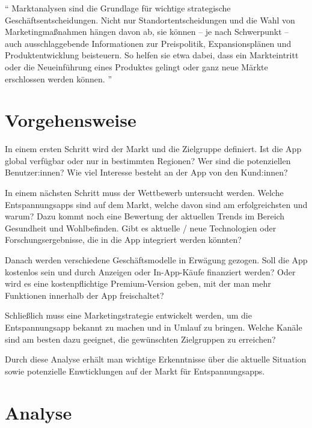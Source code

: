 "`
Marktanalysen sind die Grundlage für wichtige strategische Geschäftsentscheidungen. 
Nicht nur Standortentscheidungen und die Wahl von Marketingmaßnahmen hängen davon ab, sie können – je nach 
Schwerpunkt – auch ausschlaggebende Informationen zur Preispolitik, Expansionsplänen und Produktentwicklung 
beisteuern. So helfen sie etwa dabei, dass ein Markteintritt oder die Neueinführung eines Produktes gelingt
oder ganz neue Märkte erschlossen werden können. 
"'
\cite{marktanalyse}

\section{Vorgehensweise}

In einem ersten Schritt wird der Markt und die Zielgruppe definiert. 
Ist die App global verfügbar oder nur in bestimmten Regionen? Wer sind die potenziellen Benutzer:innen?
Wie viel Interesse besteht an der App von den Kund:innen?

In einem nächsten Schritt muss der Wettbewerb untersucht werden.
Welche Entspannungsapps sind auf dem Markt, welche davon sind am erfolgreichsten und warum?
Dazu kommt noch eine Bewertung der aktuellen Trends im Bereich Gesundheit und Wohlbefinden. 
Gibt es aktuelle / neue Technologien oder Forschungsergebnisse, die in die App integriert werden könnten?

Danach werden verschiedene Geschäftsmodelle in Erwägung gezogen. 
Soll die App kostenlos sein und durch Anzeigen oder In-App-Käufe finanziert werden? 
Oder wird es eine kostenpflichtige Premium-Version geben, mit der man mehr Funktionen innerhalb der App freischaltet?

Schließlich muss eine Marketingstrategie entwickelt werden, um die Entspannungsapp bekannt zu machen und
in Umlauf zu bringen. 
Welche Kanäle sind am besten dazu geeignet, die gewünschten Zielgruppen zu erreichen?



Durch diese Analyse erhält man wichtige Erkenntnisse über die aktuelle Situation sowie potenzielle Enwticklungen
auf der Markt für Entspannungsapps.


\section{Analyse}

